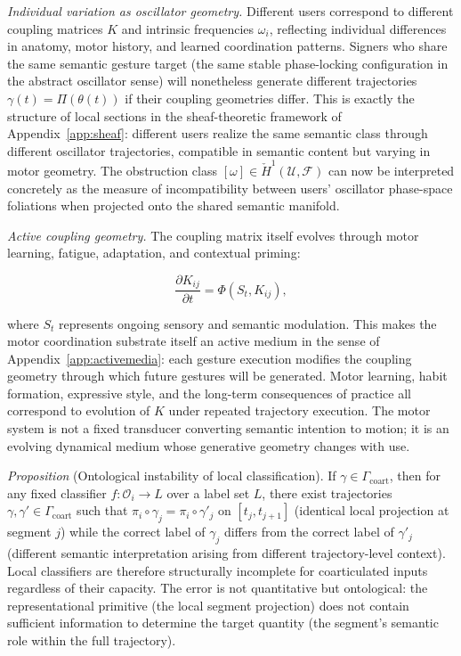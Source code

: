 \documentclass[11pt, a4paper]{article}
\theoremstyle{definition}
\begin{document}
\textit{Individual variation as oscillator geometry.} Different users correspond to different coupling matrices $K$ and intrinsic frequencies $\omega_i$, reflecting individual differences in anatomy, motor history, and learned coordination patterns. Signers who share the same semantic gesture target (the same stable phase-locking configuration in the abstract oscillator sense) will nonetheless generate different trajectories $\gamma(t) = \Pi(\theta(t))$ if their coupling geometries differ. This is exactly the structure of local sections in the sheaf-theoretic framework of Appendix~\ref{app:sheaf}: different users realize the same semantic class through different oscillator trajectories, compatible in semantic content but varying in motor geometry. The obstruction class $[\omega] \in \check{H}^1(\mathcal{U}, \mathcal{F})$ can now be interpreted concretely as the measure of incompatibility between users' oscillator phase-space foliations when projected onto the shared semantic manifold.

\textit{Active coupling geometry.} The coupling matrix itself evolves through motor learning, fatigue, adaptation, and contextual priming:

\[
\frac{\partial K_{ij}}{\partial t} = \Phi(S_t, K_{ij}),
\]

where $S_t$ represents ongoing sensory and semantic modulation. This makes the motor coordination substrate itself an active medium in the sense of Appendix~\ref{app:activemedia}: each gesture execution modifies the coupling geometry through which future gestures will be generated. Motor learning, habit formation, expressive style, and the long-term consequences of practice all correspond to evolution of $K$ under repeated trajectory execution. The motor system is not a fixed transducer converting semantic intention to motion; it is an evolving dynamical medium whose generative geometry changes with use.

\textit{Proposition} (Ontological instability of local classification). If $\gamma \in \Gamma_{\mathrm{coart}}$, then for any fixed classifier $f : \mathcal{O}_i \to L$ over a label set $L$, there exist trajectories $\gamma, \gamma' \in \Gamma_{\mathrm{coart}}$ such that $\pi_i \circ \gamma_j = \pi_i \circ \gamma'_j$ on $[t_j, t_{j+1}]$ (identical local projection at segment $j$) while the correct label of $\gamma_j$ differs from the correct label of $\gamma'_j$ (different semantic interpretation arising from different trajectory-level context). Local classifiers are therefore structurally incomplete for coarticulated inputs regardless of their capacity. The error is not quantitative but ontological: the representational primitive (the local segment projection) does not contain sufficient information to determine the target quantity (the segment's semantic role within the full trajectory).
\end{document}
